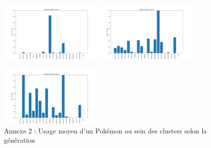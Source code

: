 \documentclass[a4paper,12pt]{article}
\begin{document}
\begin{figure}[!h]
    \vspace{1em}  %

    \includegraphics[width=0.45\textwidth]{Clustering/usage_gen/gen7.png}
    \includegraphics[width=0.45\textwidth]{Clustering/usage_gen/gen8.png}
    

    \vspace{1em}  %

    \includegraphics[width=0.45\textwidth]{Clustering/usage_gen/gen9.png}
    \caption*{Annexe 2 : Usage moyen d'un Pokémon au sein des clusters selon la génération}
\end{figure}
\end{document}
